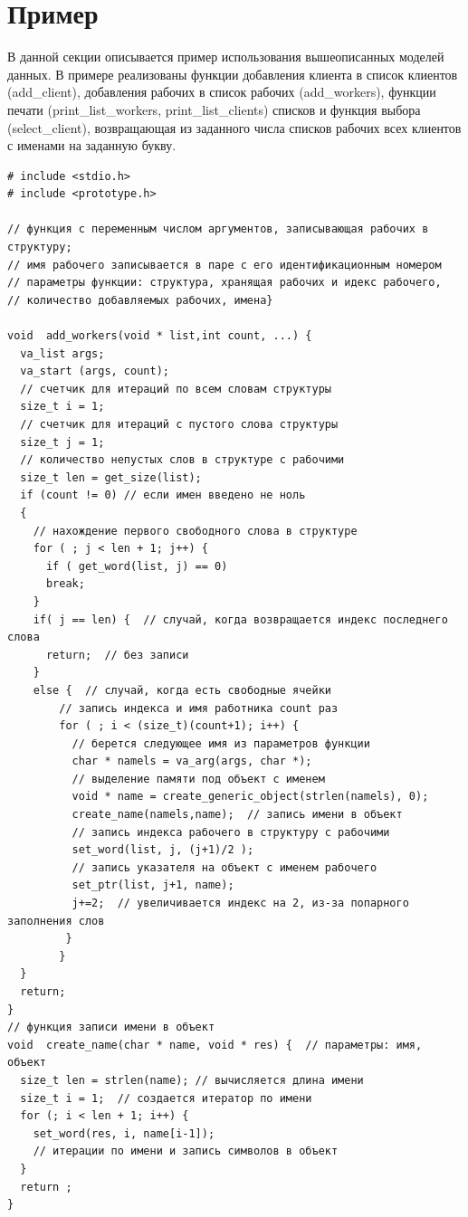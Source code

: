 \section{Пример}
В данной секции описывается пример использования вышеописанных моделей данных.
В примере реализованы функции добавления клиента в список клиентов (add\_client), добавления рабочих в список рабочих (add\_workers), функции печати (print\_list\_workers, print\_list\_clients) списков и функция выбора (select\_client),
возвращающая из заданного числа списков рабочих всех клиентов с именами на заданную букву.  

\begin{verbatim}
# include <stdio.h>
# include <prototype.h>

// функция с переменным числом аргументов, записывающая рабочих в структуру;
// имя рабочего записывается в паре с его идентификационным номером
// параметры функции: структура, хранящая рабочих и идекс рабочего, 
// количество добавляемых рабочих, имена}

void  add_workers(void * list,int count, ...) { 
  va_list args;                                 
  va_start (args, count);
  // счетчик для итераций по всем словам структуры
  size_t i = 1;
  // счетчик для итераций с пустого слова структуры
  size_t j = 1;
  // количество непустых слов в структуре с рабочими 
  size_t len = get_size(list);
  if (count != 0) // если имен введено не ноль
  {
    // нахождение первого свободного слова в структуре
    for ( ; j < len + 1; j++) {  
      if ( get_word(list, j) == 0)  
      break;
    }
    if( j == len) {  // случай, когда возвращается индекс последнего слова
      return;  // без записи
    }
    else {  // случай, когда есть свободные ячейки
        // запись индекса и имя работника count раз
        for ( ; i < (size_t)(count+1); i++) {
          // берется следующее имя из параметров функции
          char * namels = va_arg(args, char *);
          // выделение памяти под объект с именем
          void * name = create_generic_object(strlen(namels), 0);  
          create_name(namels,name);  // запись имени в объект
          // запись индекса рабочего в структуру с рабочими
          set_word(list, j, (j+1)/2 );
          // запись указателя на объект с именем рабочего
          set_ptr(list, j+1, name);  
          j+=2;  // увеличивается индекс на 2, из-за попарного заполнения слов
         }
        }
  }
  return;
}
// функция записи имени в объект
void  create_name(char * name, void * res) {  // параметры: имя, объект
  size_t len = strlen(name); // вычисляется длина имени
  size_t i = 1;  // создается итератор по имени
  for (; i < len + 1; i++) {
    set_word(res, i, name[i-1]);  
    // итерации по имени и запись символов в объект
  }
  return ;
}


\end{verbatim}
